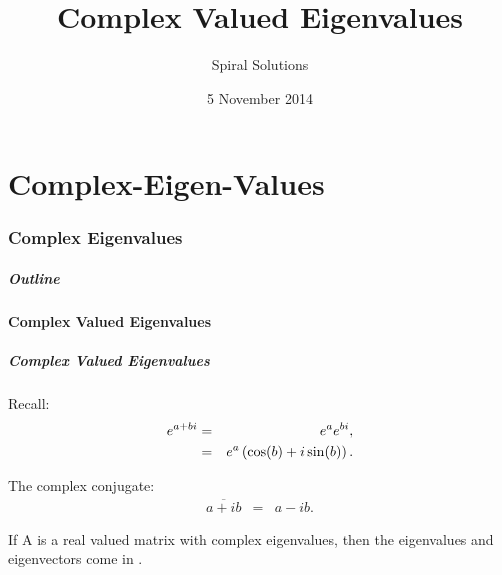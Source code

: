 \part{Complex-Eigen-Values}
\section{Complex Eigenvalues}


\title{Complex Valued Eigenvalues}
\subtitle{Spiral Solutions}
\date{5 November 2014}

\begin{frame}
  \titlepage
\end{frame}

\begin{frame}
  \frametitle{Outline}
  \tableofcontents[currentsection]
\end{frame}


\subsection{Complex Valued Eigenvalues}


\begin{frame}
  \frametitle{Complex Valued Eigenvalues}

  Recall:
  \begin{eqnarray*}
    e^{a+bi} & = & e^a e^{bi}, \\
    & = & e^a \left( \cos(b) + i \sin(b) \right).
  \end{eqnarray*}

  \vfill

  The complex conjugate:
  \begin{eqnarray*}
    \overline{a+ib} & = & a-i b.
  \end{eqnarray*}

  \vfill

  If A is a real valued matrix with complex eigenvalues, then
  the eigenvalues and eigenvectors come in .

\end{frame}

